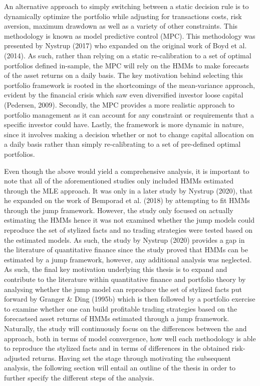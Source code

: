 An alternative approach to simply switching between a static decision rule is to dynamically optimize the portfolio while adjusting for transactions costs, risk aversion, maximum drawdown as well as a variety of other constraints. This methodology is known as model predictive control (MPC). This methodology was presented by Nystrup (2017) who expanded on the original work of Boyd et al. (2014). As such, rather than relying on a static re-calibration to a set of optimal portfolios defined in-sample, the MPC will rely on the HMMs to make forecasts of the asset returns on a daily basis. The key motivation behind selecting this portfolio framework is rooted in the shortcomings of the mean-variance approach, evident by the financial crisis which saw even diversified investor loose capital (Pedersen, 2009). Secondly, the MPC provides a more realistic approach to portfolio management as it can account for any constraint or requirements that a specific investor could have. Lastly, the framework is more dynamic in nature, since it involves making a decision whether or not to change capital allocation on a daily basis rather than simply re-calibrating to a set of pre-defined optimal portfolios.

Even though the above would yield a comprehensive analysis, it is important to note that all of the aforementioned studies only included HMMs estimated through the MLE approach. It was only in a later study by Nystrup (2020), that he expanded on the work of Bemporad et al. (2018) by attempting to fit HMMs through the jump framework. However, the study only focused on actually estimating the HMMs hence it was not examined whether the jump models could reproduce the set of stylized facts and no trading strategies were tested based on the estimated models. As such, the study by Nystrup (2020) provides a gap in the literature of quantitative finance since the study proved that HMMs can be estimated by a jump framework, however, any additional analysis was neglected. As such, the final key motivation underlying this thesis is to expand and contribute to the literature within quantitative finance and portfolio theory by analysing whether the jump model can reproduce the set of stylized facts put forward by Granger \& Ding (1995b) which is then followed by a portfolio exercise to examine whether one can build profitable trading strategies based on the forecastsed asset returns of HMMs estimated through a jump framework. Naturally, the study will continuously focus on the differences between the \mle and \jump approach, both in terms of model convergence, how well each methodology is able to reproduce the stylized facts and in terms of differences in the obtained risk-adjusted returns. Having set the stage through motivating the subsequent analysis, the following section will entail an outline of the thesis in order to further specify the different steps of the analysis.

